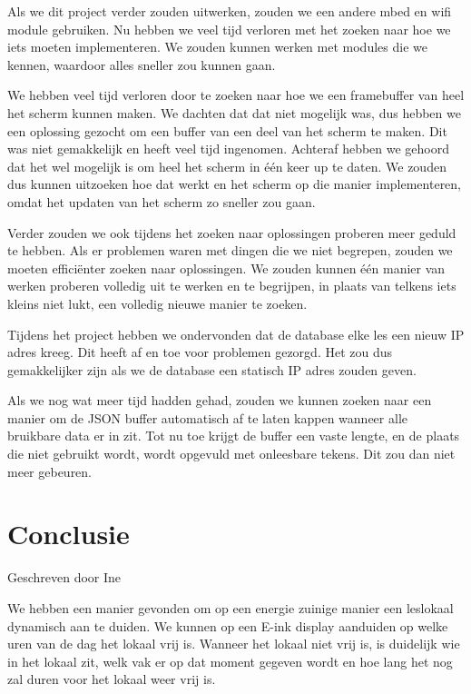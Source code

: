 \documentclass[a4paper,kul]{kulakarticle} %
\begin{document}
Als we dit project verder zouden uitwerken, zouden we een andere mbed en wifi module gebruiken. Nu hebben we veel tijd verloren met het zoeken naar hoe we iets moeten implementeren. We zouden kunnen werken met modules die we kennen, waardoor alles sneller zou kunnen gaan. 
\newline

We hebben veel tijd verloren door te zoeken naar hoe we een framebuffer van heel het scherm kunnen maken. We dachten dat dat niet mogelijk was, dus hebben we een oplossing gezocht om een buffer van een deel van het scherm te maken. Dit was niet gemakkelijk en heeft veel tijd ingenomen. Achteraf hebben we gehoord dat het wel mogelijk is om heel het scherm in één keer up te daten. We zouden dus kunnen uitzoeken hoe dat werkt en het scherm op die manier implementeren, omdat het updaten van het scherm zo sneller zou gaan. 
\newline

Verder zouden we ook tijdens het zoeken naar oplossingen proberen meer geduld te hebben. Als er problemen waren met dingen die we niet begrepen, zouden we moeten efficiënter zoeken naar oplossingen. We zouden kunnen één manier van werken proberen volledig uit te werken en te begrijpen, in plaats van telkens iets kleins niet lukt, een volledig nieuwe manier te zoeken.
\newline

Tijdens het project hebben we ondervonden dat de database elke les een nieuw IP adres kreeg. Dit heeft af en toe voor problemen gezorgd. Het zou dus gemakkelijker zijn als we de database een statisch IP adres zouden geven. 
\newline

Als we nog wat meer tijd hadden gehad, zouden we kunnen zoeken naar een manier om de JSON buffer automatisch af te laten kappen wanneer alle bruikbare data er in zit. Tot nu toe krijgt de buffer een vaste lengte, en de plaats die niet gebruikt wordt, wordt opgevuld met onleesbare tekens. Dit zou dan niet meer gebeuren.

\newpage

\section{Conclusie}
{\scriptsize Geschreven door Ine}
\newline

We hebben een manier gevonden om op een energie zuinige manier een leslokaal dynamisch aan te duiden. We kunnen op een E-ink display aanduiden op welke uren van de dag het lokaal vrij is. Wanneer het lokaal niet vrij is, is duidelijk wie in het lokaal zit, welk vak er op dat moment gegeven wordt en hoe lang het nog zal duren voor het lokaal  weer vrij is.

\newpage



\end{document}
